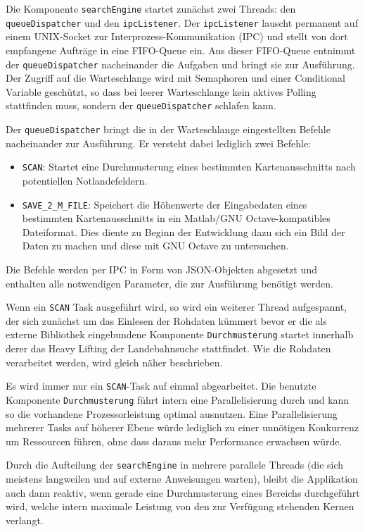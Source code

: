 \documentclass[10pt,a4paper]{report}
\begin{document}
Die Komponente \texttt{searchEngine} startet zunächst zwei Threads: den \verb|queueDispatcher| und den \verb|ipcListener|. Der  \verb|ipcListener| lauscht permanent auf einem UNIX-Socket zur Interprozess-Kommunikation (IPC) und stellt von dort empfangene Aufträge in eine FIFO-Queue ein. Aus dieser FIFO-Queue entnimmt der \verb|queueDispatcher| nacheinander die Aufgaben und bringt sie zur Ausführung. Der Zugriff auf die Warteschlange wird mit Semaphoren und einer Conditional Variable geschützt, so dass bei leerer Warteschlange kein aktives Polling stattfinden muss, sondern der \verb|queueDispatcher| schlafen kann.

Der \verb|queueDispatcher| bringt die in der Warteschlange eingestellten Befehle nacheinander zur Ausführung. Er versteht dabei lediglich zwei Befehle: 
\begin{itemize}
	\item \verb|SCAN|: Startet eine Durchmusterung eines bestimmten Kartenausschnitts nach potentiellen Notlandefeldern.
	\item \verb|SAVE_2_M_FILE|: Speichert die Höhenwerte der Eingabedaten eines bestimmten Kartenausschnitts in ein Matlab/GNU Octave-kompatibles Dateiformat. Dies diente zu Beginn der Entwicklung dazu sich ein Bild der Daten zu machen und diese mit GNU Octave zu untersuchen.
\end{itemize}
Die Befehle werden per IPC in Form von JSON-Objekten abgesetzt und enthalten alle notwendigen Parameter, die zur Ausführung benötigt werden.

Wenn ein \verb|SCAN| Task ausgeführt wird, so wird ein weiterer Thread aufgespannt, der sich zunächst um das Einlesen der Rohdaten kümmert bevor er die als externe Bibliothek eingebundene Komponente \texttt{Durchmusterung} startet innerhalb derer das Heavy Lifting der Landebahnsuche stattfindet. Wie die Rohdaten verarbeitet werden, wird gleich näher beschrieben.

Es wird immer nur ein \verb|SCAN|-Task auf einmal abgearbeitet. Die benutzte Komponente \texttt{Durchmusterung} führt intern eine Parallelisierung durch und kann so die vorhandene Prozessorleistung optimal ausnutzen. Eine Parallelisierung mehrerer Tasks auf höherer Ebene würde lediglich zu einer unnötigen Konkurrenz um Ressourcen führen, ohne dass daraus mehr Performance erwachsen würde.

Durch die Aufteilung der \texttt{searchEngine} in mehrere parallele Threads (die sich meistens langweilen und auf externe Anweisungen warten), bleibt die Applikation auch dann reaktiv, wenn gerade eine Durchmusterung eines Bereichs durchgeführt wird, welche intern maximale Leistung von den zur Verfügung stehenden Kernen verlangt.
\end{document}

